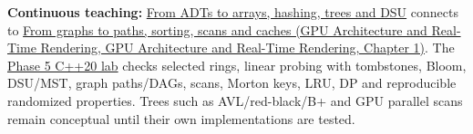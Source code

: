 \textbf{Continuous teaching:} \hyperref[01-foundations-i-ch007-the-scene-is-now-too-large-for-the-wrong-container-phase-5-m025m027-parts-401445]{From ADTs to arrays, hashing, trees and DSU} connects to \href{../06-GPU-Architecture-and-Real-Time-Rendering/main.pdf\#nameddest=01-foundations-i-ch008-from-an-asset-map-to-a-correct-navigable-world-phase-5-m028m030-parts-446500}{From graphs to paths, sorting, scans and caches (GPU Architecture and Real-Time Rendering, GPU Architecture and Real-Time Rendering, Chapter 1)}. The \hyperref[source-file-0ec69e1a1a11439bca29faa5]{Phase 5 C++20 lab} checks selected rings, linear probing with tombstones, Bloom, DSU/MST, graph paths/DAGs, scans, Morton keys, LRU, DP and reproducible randomized properties. Trees such as AVL/red-black/B+ and GPU parallel scans remain conceptual until their own implementations are tested.

